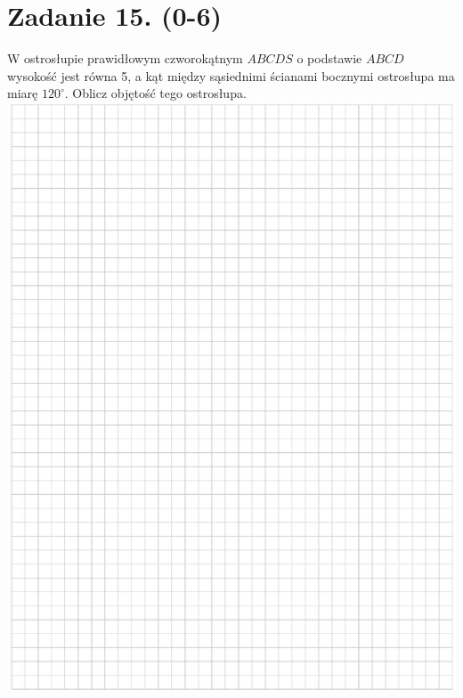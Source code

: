 \documentclass[10pt]{article}
\begin{document}
\section*{Zadanie 15. (0-6)}
W ostrosłupie prawidłowym czworokątnym \(A B C D S\) o podstawie \(A B C D\) wysokość jest równa 5, a kąt między sąsiednimi ścianami bocznymi ostrosłupa ma miarę \(120^{\circ}\). Oblicz objętość tego ostrosłupa.\\
\includegraphics[max width=\textwidth, center]{2024_11_21_054c332d5c02f869c372g-18}\\
\end{document}
